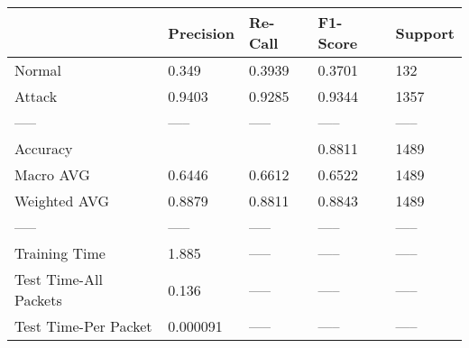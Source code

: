 \begin{tabular}{lllll}
\toprule
{} & Precision & Re-Call & F1-Score & Support \\
\midrule
Normal                &     0.349 &  0.3939 &   0.3701 &     132 \\
Attack                &    0.9403 &  0.9285 &   0.9344 &    1357 \\
-----                 &     ----- &   ----- &    ----- &   ----- \\
Accuracy              &           &         &   0.8811 &    1489 \\
Macro AVG             &    0.6446 &  0.6612 &   0.6522 &    1489 \\
Weighted AVG          &    0.8879 &  0.8811 &   0.8843 &    1489 \\
-----                 &     ----- &   ----- &    ----- &   ----- \\
Training Time         &     1.885 &   ----- &    ----- &   ----- \\
Test Time-All Packets &     0.136 &   ----- &    ----- &   ----- \\
Test Time-Per Packet  &  0.000091 &   ----- &    ----- &   ----- \\
\bottomrule
\end{tabular}
